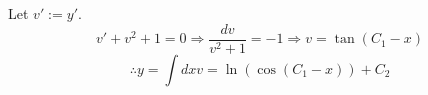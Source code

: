 \item

Let $v' := y'$.
\[
	v' + v^2 + 1 = 0
	\Rightarrow \frac{dv}{v^2 + 1} = -1
	\Rightarrow v = \tan (C_1 - x)
\]
\[
	\therefore y = \int dx v = \ln \left( \cos (C_1 - x) \right) + C_2
\]